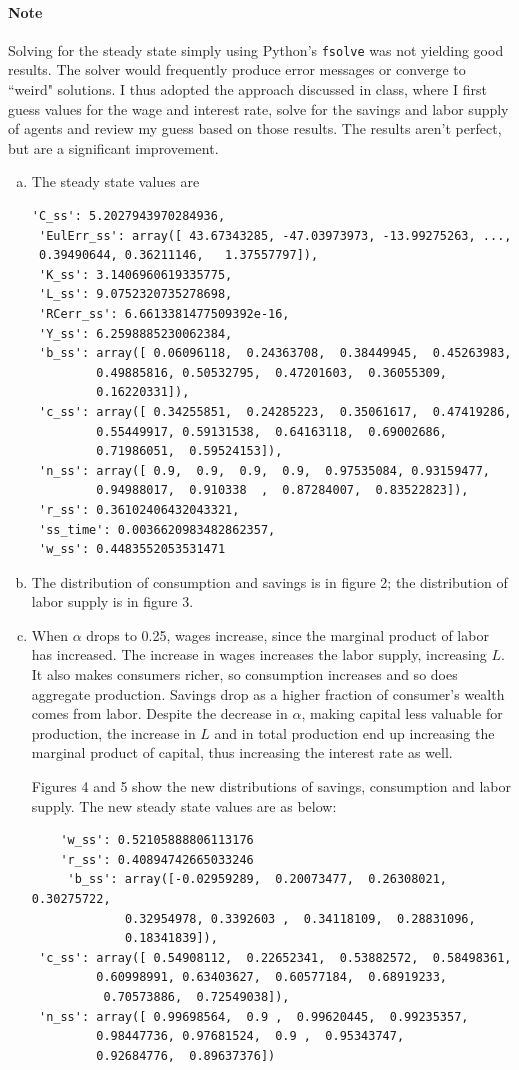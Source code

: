 \documentclass[letterpaper,12pt]{article}
\theoremstyle{definition}
\begin{document}
\begin{enumerate}
	\paragraph{Note} Solving for the steady state simply using Python's \texttt{fsolve} was not yielding good results. The solver would frequently produce error messages or converge to ``weird" solutions. I thus adopted the approach discussed in class, where I first guess values for the wage and interest rate, solve for the savings and labor supply of agents and review my guess based on those results. The results aren't perfect, but are a significant improvement.
	\begin{enumerate}[(a)]
	\item The steady state values are
	\begin{verbatim}
'C_ss': 5.2027943970284936,
 'EulErr_ss': array([ 43.67343285, -47.03973973, -13.99275263, ...,   
 0.39490644, 0.36211146,   1.37557797]),
 'K_ss': 3.1406960619335775,
 'L_ss': 9.0752320735278698,
 'RCerr_ss': 6.6613381477509392e-16,
 'Y_ss': 6.2598885230062384,
 'b_ss': array([ 0.06096118,  0.24363708,  0.38449945,  0.45263983, 
         0.49885816, 0.50532795,  0.47201603,  0.36055309,  
         0.16220331]),
 'c_ss': array([ 0.34255851,  0.24285223,  0.35061617,  0.47419286, 
         0.55449917, 0.59131538,  0.64163118,  0.69002686,  
         0.71986051,  0.59524153]),
 'n_ss': array([ 0.9,  0.9,  0.9,  0.9,  0.97535084, 0.93159477, 
         0.94988017,  0.910338  ,  0.87284007,  0.83522823]),
 'r_ss': 0.36102406432043321,
 'ss_time': 0.0036620983482862357,
 'w_ss': 0.4483552053531471
	\end{verbatim}
	\item The distribution of consumption and savings is in figure 2; the distribution of labor supply is in figure 3.
	\item When $\alpha$ drops to 0.25, wages increase, since the marginal product of labor has increased. The increase in wages increases the labor supply, increasing $L$. It also makes consumers richer, so consumption increases and so does aggregate production. Savings drop as a higher fraction of consumer's wealth comes from labor. Despite the decrease in $\alpha$, making capital less valuable for production, the increase in $L$ and in total production end up increasing the marginal product of capital, thus increasing the interest rate as well. 
	
	Figures 4 and 5 show the new distributions of savings, consumption and labor supply. The new steady state values are as below:
	\begin{verbatim}
	'w_ss': 0.52105888806113176
	'r_ss': 0.40894742665033246
	 'b_ss': array([-0.02959289,  0.20073477,  0.26308021,  0.30275722,
	         0.32954978, 0.3392603 ,  0.34118109,  0.28831096,  
	         0.18341839]),
 'c_ss': array([ 0.54908112,  0.22652341,  0.53882572,  0.58498361, 
         0.60998991, 0.63403627,  0.60577184,  0.68919233, 
          0.70573886,  0.72549038]),
 'n_ss': array([ 0.99698564,  0.9 ,  0.99620445,  0.99235357,  
         0.98447736, 0.97681524,  0.9 ,  0.95343747,  
         0.92684776,  0.89637376])
	\end{verbatim}
	\end{enumerate}
	

\end{enumerate}
\end{document}
